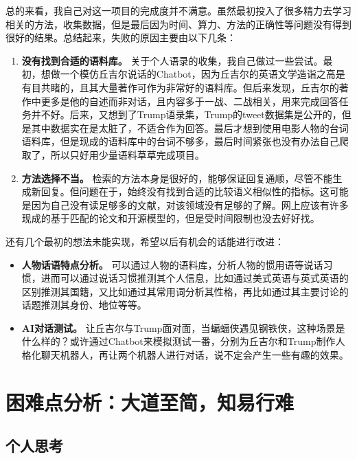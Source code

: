 \documentclass[12pt]{article} %
\begin{document}
\begin{sloppypar}
总的来看，我自己对这一项目的完成度并不满意。虽然最初投入了很多精力去学习相关的方法，收集数据，但是最后因为时间、算力、方法的正确性等问题没有得到很好的结果。总结起来，失败的原因主要由以下几条：
\begin{enumerate}
	\item {\bf 没有找到合适的语料库。} 关于个人语录的收集，我自己做过一些尝试。最初，想做一个模仿丘吉尔说话的Chatbot，因为丘吉尔的英语文学造诣之高是有目共睹的，且其大量著作可作为非常好的语料库。但后来发现，丘吉尔的著作中更多是他的自述而非对话，且内容多于一战、二战相关，用来完成回答任务并不好。后来，又想到了Trump语录集，Trump的tweet数据集是公开的，但是其中数据实在是太脏了，不适合作为回答。最后才想到使用电影人物的台词语料库，但是现成的语料库中的台词不够多，最后时间紧张也没有办法自己爬取了，所以只好用少量语料草草完成项目。
	\item {\bf 方法选择不当。} 检索的方法本身是很好的，能够保证回复通顺，尽管不能生成新回复。但问题在于，始终没有找到合适的比较语义相似性的指标。这可能是因为自己没有读足够多的文献，对该领域没有足够的了解。网上应该有许多现成的基于匹配的论文和开源模型的，但是受时间限制也没去好好找。
\end{enumerate}

还有几个最初的想法未能实现，希望以后有机会的话能进行改进：
\begin{itemize}
	\item {\bf 人物话语特点分析。} 可以通过人物的语料库，分析人物的惯用语等说话习惯，进而可以通过说话习惯推测其个人信息，比如通过美式英语与英式英语的区别推测其国籍，又比如通过其常用词分析其性格，再比如通过其主要讨论的话题推测其身份、地位等等。
	\item {\bf AI对话测试。} 让丘吉尔与Trump面对面，当蝙蝠侠遇见钢铁侠，这种场景是什么样的？或许通过Chatbot来模拟测试一番，分别为丘吉尔和Trump制作人格化聊天机器人，再让两个机器人进行对话，说不定会产生一些有趣的效果。
\end{itemize}

\section{困难点分析：大道至简，知易行难}
\label{sec:error}

\subsection{个人思考}


\end{sloppypar}
\end{document}
